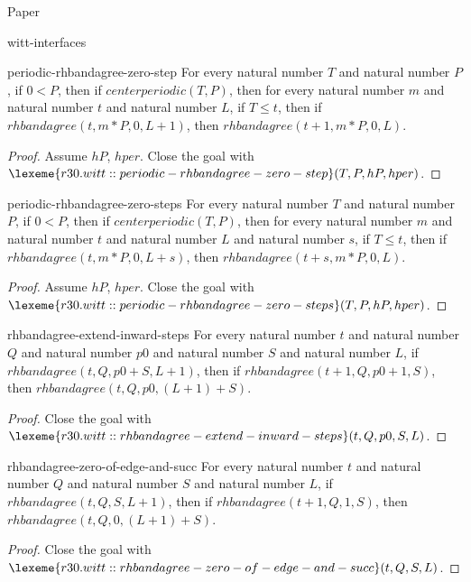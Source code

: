 \begin{lexlean}{Paper}
\begin{section}{witt-interfaces}
  \begin{theorem}{periodic-rhbandagree-zero-step}
  For every natural number \(T\) and natural number \(P\), if \(0 < P\), then if \(centerperiodic(T, P)\), then for every natural number \(m\) and natural number \(t\) and natural number \(L\), if \(T ≤ t\), then if \(rhbandagree(t, m * P, 0, L + 1)\), then \(rhbandagree(t + 1, m * P, 0, L)\).
  \begin{proof}
  Assume \(hP\), \(hper\).
  Close the goal with \(\lexeme{r30.witt::periodic-rhbandagree-zero-step}(T, P, hP, hper)\).
  \end{proof}
  \end{theorem}

  \begin{theorem}{periodic-rhbandagree-zero-steps}
  For every natural number \(T\) and natural number \(P\), if \(0 < P\), then if \(centerperiodic(T, P)\), then for every natural number \(m\) and natural number \(t\) and natural number \(L\) and natural number \(s\), if \(T ≤ t\), then if \(rhbandagree(t, m * P, 0, L + s)\), then \(rhbandagree(t + s, m * P, 0, L)\).
  \begin{proof}
  Assume \(hP\), \(hper\).
  Close the goal with \(\lexeme{r30.witt::periodic-rhbandagree-zero-steps}(T, P, hP, hper)\).
  \end{proof}
  \end{theorem}

  \begin{theorem}{rhbandagree-extend-inward-steps}
  For every natural number \(t\) and natural number \(Q\) and natural number \(p0\) and natural number \(S\) and natural number \(L\), if \(rhbandagree(t, Q, p0 + S, L + 1)\), then if \(rhbandagree(t + 1, Q, p0 + 1, S)\), then \(rhbandagree(t, Q, p0, (L + 1) + S)\).
  \begin{proof}
  Close the goal with \(\lexeme{r30.witt::rhbandagree-extend-inward-steps}(t, Q, p0, S, L)\).
  \end{proof}
  \end{theorem}

  \begin{theorem}{rhbandagree-zero-of-edge-and-succ}
  For every natural number \(t\) and natural number \(Q\) and natural number \(S\) and natural number \(L\), if \(rhbandagree(t, Q, S, L + 1)\), then if \(rhbandagree(t + 1, Q, 1, S)\), then \(rhbandagree(t, Q, 0, (L + 1) + S)\).
  \begin{proof}
  Close the goal with \(\lexeme{r30.witt::rhbandagree-zero-of-edge-and-succ}(t, Q, S, L)\).
  \end{proof}
  \end{theorem}


\end{section}
\end{lexlean}
